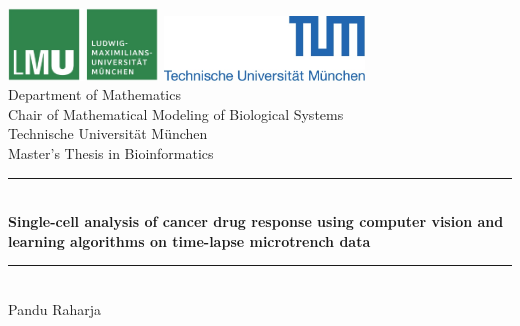 \documentclass[pdftex,12pt,a4paper]{report}
\newcommand{\HRule}{\rule{\linewidth}{0.5mm}}
\begin{document}
\begin{titlepage}

\sffamily

\begin{center}


\includegraphics[width=0.3\textwidth]{logo2.jpg}
\hfill
\includegraphics[width=0.4\textwidth]{logo1.jpg}  
\\[5cm]

{\Large Department of Mathematics}\\[0.5cm]
{\Large Chair of Mathematical Modeling of Biological Systems}\\[0.5cm]
{Technische Universit\"at M\"unchen}\\[2cm]
{\Large Master's Thesis in Bioinformatics}\\[1.5cm]

\HRule \\[0.4cm]
{ \huge \bfseries Single-cell analysis of cancer drug response using computer vision and learning algorithms on time-lapse microtrench data}\\[0.4cm]

\HRule \\[1.5cm]

{\Large Pandu Raharja}\\[2.5cm]

\vfill
\end{center}
\end{titlepage}
\end{document}
